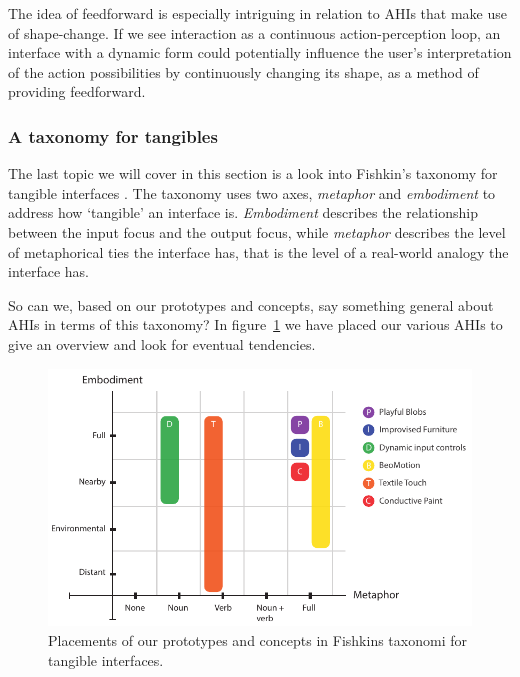 The idea of feedforward is especially intriguing in relation to AHIs that make use of shape-change.
If we see interaction as a continuous action-perception loop, an interface with a dynamic form could potentially influence the user's interpretation of the action possibilities by continuously changing its shape, as a method of providing feedforward.




\subsubsection{A taxonomy for tangibles}
The last topic we will cover in this section is a look into Fishkin's taxonomy for tangible interfaces \citep{fishkin2004taxonomy}.
The taxonomy uses two axes, \emph{metaphor} and \emph{embodiment} to address how `tangible' an interface is.
\emph{Embodiment} describes the relationship between the input focus and the output focus, while \emph{metaphor} describes the level of metaphorical ties the interface has, that is the level of a real-world analogy the interface has.

So can we, based on our prototypes and concepts, say something general about AHIs in terms of this taxonomy?
In figure~\ref{fig:ch:adhoc2:fishkin} we have placed our various AHIs to give an overview and look for eventual tendencies. 

\begin{figure}[h]
  \centering
  \includegraphics[width=.9\textwidth]{figures/adhoc2/fishkin.pdf}
  \caption[Placements of our prototypes and concepts in Fishkins taxonomi]
  {Placements of our prototypes and concepts in Fishkins taxonomi for tangible interfaces.}
  \label{fig:ch:adhoc2:fishkin}
\end{figure}

